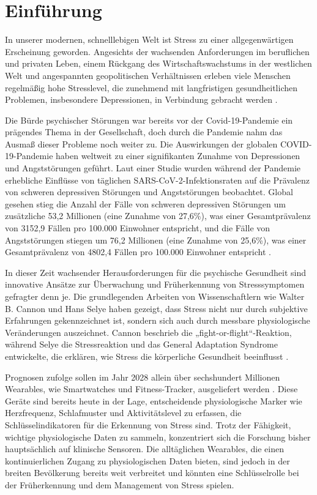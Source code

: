 \section{Einführung}

In unserer modernen, schnelllebigen Welt ist Stress zu einer allgegenwärtigen Erscheinung geworden. 
Angesichts der wachsenden Anforderungen im beruflichen und privaten Leben, einem Rückgang des Wirtschaftswachstums 
in der westlichen Welt und angespannten geopolitischen Verhältnissen erleben viele Menschen regelmäßig hohe Stresslevel, 
die zunehmend mit langfristigen gesundheitlichen Problemen, insbesondere Depressionen, in Verbindung gebracht werden \cite{Wang2008} \cite{Wang2001}.

Die Bürde psychischer Störungen war bereits vor der Covid-19-Pandemie ein prägendes Thema in der Gesellschaft, 
doch durch die Pandemie nahm das Ausmaß dieser Probleme noch weiter zu. Die Auswirkungen der globalen COVID-19-Pandemie 
haben weltweit zu einer signifikanten Zunahme von Depressionen und Angststörungen geführt. Laut einer Studie wurden 
während der Pandemie erhebliche Einflüsse von täglichen SARS-CoV-2-Infektionsraten auf die Prävalenz von schweren depressiven 
Störungen und Angststörungen beobachtet. Global gesehen stieg die Anzahl der Fälle von schweren depressiven Störungen um 
zusätzliche 53,2 Millionen (eine Zunahme von 27,6\%), was einer Gesamtprävalenz von 3152,9 Fällen pro 100.000 Einwohner entspricht, 
und die Fälle von Angststörungen stiegen um 76,2 Millionen (eine Zunahme von 25,6\%), was einer Gesamtprävalenz von 4802,4 Fällen 
pro 100.000 Einwohner entspricht \cite{Santomauro2021}.

In dieser Zeit wachsender Herausforderungen für die psychische Gesundheit sind innovative Ansätze zur Überwachung und Früherkennung 
von Stresssymptomen gefragter denn je. Die grundlegenden Arbeiten von Wissenschaftlern wie Walter B. Cannon und Hans Selye haben gezeigt, 
dass Stress nicht nur durch subjektive Erfahrungen gekennzeichnet ist, sondern sich auch durch messbare physiologische Veränderungen auszeichnet. 
Cannon beschrieb die „fight-or-flight“-Reaktion, während Selye die Stressreaktion und das General Adaptation Syndrome entwickelte, 
die erklären, wie Stress die körperliche Gesundheit beeinflusst \cite{Cannon1915} \cite{Selye1936}.

Prognosen zufolge sollen im Jahr 2028 allein über sechshundert Millionen Wearables, wie Smartwatches und Fitness-Tracker, 
ausgeliefert werden \cite{IDC2023}. Diese Geräte sind bereits heute in der Lage, entscheidende physiologische Marker wie Herzfrequenz, 
Schlafmuster und Aktivitätslevel zu erfassen, die Schlüsselindikatoren für die Erkennung von Stress sind. Trotz der Fähigkeit, 
wichtige physiologische Daten zu sammeln, konzentriert sich die Forschung bisher hauptsächlich auf klinische Sensoren. Die alltäglichen Wearables, 
die einen kontinuierlichen Zugang zu physiologischen Daten bieten, sind jedoch in der breiten Bevölkerung bereits weit verbreitet und könnten eine 
Schlüsselrolle bei der Früherkennung und dem Management von Stress spielen.

